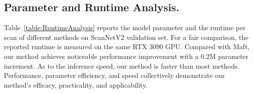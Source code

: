 \subsection{Parameter and Runtime Analysis.}
Table~\ref{table:RuntimeAnalysis} reports the model parameter and the runtime per scan of
different methods on ScanNetV2 validation set. 
%
For a fair comparison, the reported runtime is measured on the
same RTX 3090 GPU.
%
Compared with Maft, our method achieves noticeable performance improvement with a 0.2M parameter increment.
%
As to the inference speed, our method is faster than most methods.
Performance, parameter efficiency, and speed collectively demonstrate our method's efficacy, practicality, and applicability.

